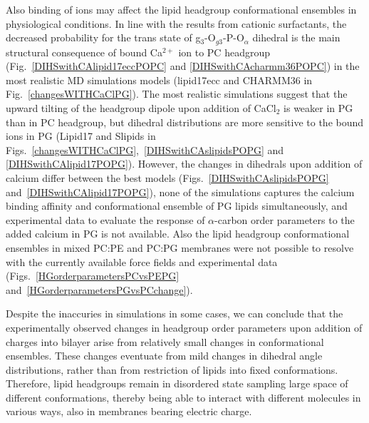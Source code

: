 \documentclass[aps,prl,superscriptaddress,twocolumn]{revtex4}
\begin{document}
Also binding of ions may affect the lipid headgroup conformational ensembles in physiological conditions. In line with the results from cationic surfactants, the decreased probability for the trans state of g$_3$-O$_{g3}$-P-O$_\alpha$ dihedral is the main structural consequence of
bound Ca$^{2+}$ ion to PC headgroup (Fig.~\ref{DIHSwithCAlipid17eccPOPC} and \ref{DIHSwithCAcharmm36POPC}) in the most realistic MD simulations models (lipid17ecc and CHARMM36 in Fig.~\ref{changesWITHCaClPG}).
The most realistic simulations suggest
that the upward tilting of the headgroup dipole upon addition of CaCl$_2$ is weaker in PG than in PC headgroup,
but dihedral distributions are more sensitive to the bound ions in PG (Lipid17 and Slipids in Figs.~\ref{changesWITHCaClPG},~\ref{DIHSwithCAslipidsPOPG} and \ref{DIHSwithCAlipid17POPG}).
However, the changes in dihedrals upon addition of calcium differ between the best models (Figs.~\ref{DIHSwithCAslipidsPOPG} and~\ref{DIHSwithCAlipid17POPG}), none of the simulations captures the calcium binding affinity and conformational ensemble of PG lipids simultaneously, and experimental data to evaluate the response of $\alpha$-carbon order parameters to the added calcium in PG is not available. Also the lipid headgroup conformational ensembles in mixed PC:PE and PC:PG membranes were not possible to resolve with the currently available force fields and experimental data (Figs.~\ref{HGorderparametersPCvsPEPG} and~\ref{HGorderparametersPGvsPCchange}).


Despite the 
inaccuries in simulations in some cases, we can conclude that the experimentally observed changes in headgroup order parameters upon addition of charges into bilayer arise from relatively small changes in conformational ensembles. These changes eventuate from mild changes in dihedral angle distributions, rather than from restriction of lipids into
fixed conformations. Therefore, lipid headgroups remain in disordered state sampling large space of different conformations, thereby being able to interact with different molecules in various ways, also in membranes bearing electric charge.
\end{document}
